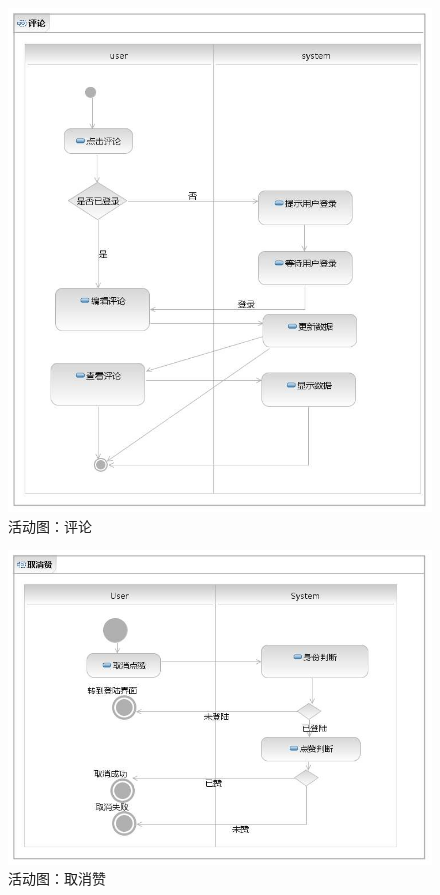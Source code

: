 \documentclass[a4paper,14pt]{ctexart}
\begin{document}
\begin{figure}[H]
\centering\includegraphics[width=4.5in]{活动图-评论.jpeg}
\caption{活动图：评论}
\end{figure}

\begin{figure}[H]
\centering\includegraphics[width=4.5in]{活动图-取消赞.jpeg}
\caption{活动图：取消赞}
\end{figure}
\end{document}
